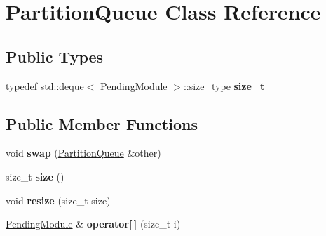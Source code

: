 \hypertarget{classPartitionQueue}{}\section{Partition\+Queue Class Reference}
\label{classPartitionQueue}
\subsection*{Public Types}
\begin{DoxyCompactItemize}
\item 
\mbox{\label{classPartitionQueue_a8e205262b5061625f354710fdd4011d6}} 
typedef std\+::deque$<$ \mbox{\hyperlink{structPendingModule}{Pending\+Module}} $>$\+::size\+\_\+type {\bfseries size\+\_\+t}
\end{DoxyCompactItemize}
\subsection*{Public Member Functions}
\begin{DoxyCompactItemize}
\item 
\mbox{\label{classPartitionQueue_a52bf5e62f399564d1af848b115dbb8fb}} 
void {\bfseries swap} (\mbox{\hyperlink{classPartitionQueue}{Partition\+Queue}} \&other)
\item 
\mbox{\label{classPartitionQueue_a31434897b54eff361e06ad75ef428579}} 
size\+\_\+t {\bfseries size} ()
\item 
\mbox{\label{classPartitionQueue_a2f2ee35b895ae25e83a1ae2e01973205}} 
void {\bfseries resize} (size\+\_\+t size)
\item 
\mbox{\label{classPartitionQueue_a9aef200cd5acfe648b49bcd00c1b663c}} 
\mbox{\hyperlink{structPendingModule}{Pending\+Module}} \& {\bfseries operator\mbox{[}$\,$\mbox{]}} (size\+\_\+t i)
\end{DoxyCompactItemize}
